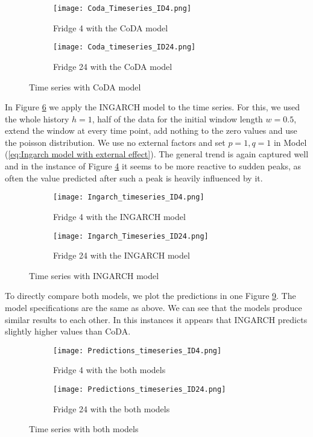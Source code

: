 \begin{figure}[htb]
\centering
\begin{subfigure}[b]{0.45\textwidth}
\texttt{[image: Coda\_Timeseries\_ID4.png]}
\caption{Fridge 4 with the CoDA model}
\label{fig:Coda Fridge 4}
\end{subfigure}
\hfill
\begin{subfigure}[b]{0.45\textwidth}
\texttt{[image: Coda\_timeseries\_ID24.png]}
\caption{Fridge 24 with the CoDA model}
\label{fig:Coda Fridge 24}
\end{subfigure}
\caption{Time series with CoDA model}
\label{fig:TS Coda}
\end{figure}

In Figure \ref{fig:TS Ingarch} we apply the INGARCH model to the time series. For this, we used the whole history $h=1$, half of the data for the initial window length $w=0.5$, extend the window at every time point, add nothing to the zero values and use the poisson distribution. We use no external factors and set $p=1, q=1$ in Model (\ref{eq:Ingarch model with external effect}). The general trend is again captured well and in the instance of Figure \ref{fig:Ingarch Fridge 4} it seems to be more reactive to sudden peaks, as often the value predicted after such a peak is heavily influenced by it.

\begin{figure}[htb]
\centering
\begin{subfigure}[b]{0.45\textwidth}
\texttt{[image: Ingarch\_timeseries\_ID4.png]}
\caption{Fridge 4 with the INGARCH model}
\label{fig:Ingarch Fridge 4}
\end{subfigure}
\hfill
\begin{subfigure}[b]{0.45\textwidth}
\texttt{[image: Ingarch\_Timeseries\_ID24.png]}
\caption{Fridge 24 with the INGARCH model}
\label{fig:Ingarch Fridge 24}
\end{subfigure}
\caption{Time series with INGARCH model}
\label{fig:TS Ingarch}
\end{figure}


To directly compare both models, we plot the predictions in one Figure \ref{fig:TS Both}. The model specifications are the same as above. We can see that the models produce similar results to each other. In this instances it appears that INGARCH predicts slightly higher values than CoDA. 

\begin{figure}[htb!]
\centering
\begin{subfigure}[b]{0.8\textwidth}
\texttt{[image: Predictions\_timeseries\_ID4.png]}
\caption{Fridge 4 with the both models}
\label{fig:Both Fridge 4}
\end{subfigure}
\hfill
\begin{subfigure}[b]{0.8\textwidth}
\texttt{[image: Predictions\_timeseries\_ID24.png]}
\caption{Fridge 24 with the both models}
\label{fig:Both Fridge 24}
\end{subfigure}
\caption{Time series with both models}
\label{fig:TS Both}
\end{figure}


